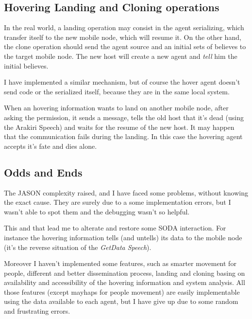 \subsection{Hovering Landing and Cloning operations}

In the real world, a landing operation may consist in the agent serializing,
which transfer itself to the new mobile node, which will resume it. On the
other hand, the clone operation should send the agent source and an initial
sets of believes to the target mobile node. The new host will create a new
agent and \emph{tell} him the initial believes.

I have implemented a similar mechanism, but of course the hover agent doesn't
send code or the serialized itself, because they are in the same local system.

When an hovering information wants to land on another mobile node, after asking
the permission, it sends a message, tells the old host that it's dead (using
the Arakiri Speech) and waits for the resume of the new host. It may happen
that the communication fails during the landing. In this case the hovering
agent accepts it's fate and dies alone.

\subsection{Odds and Ends}

The JASON complexity raised, and I have faced some problems, without knowing
the exact cause. They are surely due to a some implementation errors, but I
wasn't able to spot them and the debugging wasn't so helpful. 

This and that lead me to alterate and restore some SODA interaction. For
instance the hovering information tells (and untells) its data to the mobile
node (it's the reverse situation of the \emph{GetData Speech}).

Moreover I haven't implemented some features, such as smarter movement for
people, different and better dissemination process, landing and cloning basing
on availability and accessibility of the hovering information and system
analysis. All those features (except mayhaps for people movement) are easily
implementable using the data available to each agent, but I have give up due to
some random and frustrating errors.
